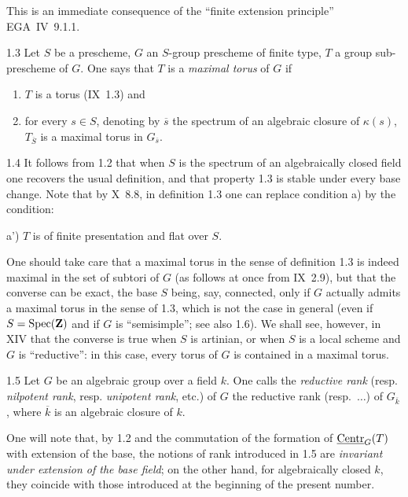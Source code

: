 This is an immediate consequence of the ``finite extension principle'' EGA~IV~9.1.1.
\begin{definition}{1.3}\label{XII.1.3}
Let $S$ be a prescheme, $G$ an $S$-group prescheme of finite type, $T$ a group sub-prescheme of $G$. One says that $T$ is a \emph{maximal torus} of $G$ if
\begin{enumerate}[label=\alph*)]
\item $T$ is a torus (IX~1.3) and
\item for every $s\in S$, denoting by $\overline s$ the spectrum of an algebraic closure of $\kappa(s)$, $T_{\overline S}$ is a maximal torus in $G_{\overline s}$.
\end{enumerate}
\end{definition}
\begin{remarks}{1.4}\label{XII.1.4}
It follows from 1.2 that when $S$ is the spectrum of an algebraically closed field one recovers the usual definition, and that property 1.3 is stable under every base change. Note that by X~8.8, in definition 1.3 one can replace condition a) by the condition:

 a') $T$ is of finite presentation and flat over $S$.

One should take care that a maximal torus in the sense of definition 1.3 is indeed maximal in the set of subtori of $G$ (as follows at once from IX~2.9), but that the converse can be exact, the base $S$ being, say, connected, only if $G$ actually admits a maximal torus in the sense of 1.3, which is not the case in general (even if $S=\operatorname{Spec}(\mathbf{Z})$ and if $G$ is ``semisimple''; see also 1.6). We shall see, however, in XIV that the converse is true when $S$ is artinian, or when $S$ is a local scheme and $G$ is ``reductive'': in this case, every torus of $G$ is contained in a maximal torus.
\end{remarks}
\begin{definition}{1.5}\label{XII.1.5}
Let $G$ be an algebraic group over a field $k$. One calls the \emph{reductive rank} (resp. \emph{nilpotent rank}, resp. \emph{unipotent rank}, etc.) of $G$ the reductive rank (resp.\ $\ldots$) of $G_{\overline k}$, where $\overline k$ is an algebraic closure of $k$.
\end{definition}
One will note that, by 1.2 and the commutation of the formation of $\underline{\mathrm{Centr}}_G(T)$ with extension of the base, the notions of rank introduced in 1.5 are \emph{invariant under extension of the base field}; on the other hand, for algebraically closed $k$, they coincide with those introduced at the beginning of the present number.
